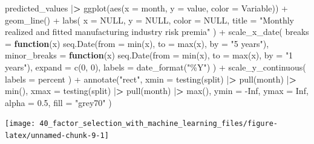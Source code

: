\documentclass[
]{book}
\newenvironment{Shaded}{\begin{snugshade}}{\end{snugshade}}
\newcommand{\AttributeTok}[1]{\textcolor[rgb]{0.61,0.61,0.61}{#1}}
\newcommand{\ConstantTok}[1]{\textcolor[rgb]{0,0,0}{#1}}
\newcommand{\ControlFlowTok}[1]{\textcolor[rgb]{0.27,0.27,0.27}{\textbf{#1}}}
\newcommand{\DecValTok}[1]{\textcolor[rgb]{0.06,0.06,0.06}{#1}}
\newcommand{\ErrorTok}[1]{\textcolor[rgb]{0.14,0.14,0.14}{\textbf{#1}}}
\newcommand{\FloatTok}[1]{\textcolor[rgb]{0.06,0.06,0.06}{#1}}
\newcommand{\FunctionTok}[1]{\textcolor[rgb]{0,0,0}{#1}}
\newcommand{\NormalTok}[1]{#1}
\newcommand{\SpecialCharTok}[1]{\textcolor[rgb]{0,0,0}{#1}}
\newcommand{\StringTok}[1]{\textcolor[rgb]{0.5,0.5,0.5}{#1}}
\begin{document}
\begin{Shaded}
\begin{Highlighting}[]
\NormalTok{predicted\_values }\SpecialCharTok{|}\ErrorTok{\textgreater{}}
  \FunctionTok{ggplot}\NormalTok{(}\FunctionTok{aes}\NormalTok{(}\AttributeTok{x =}\NormalTok{ month, }\AttributeTok{y =}\NormalTok{ value, }\AttributeTok{color =}\NormalTok{ Variable)) }\SpecialCharTok{+}
  \FunctionTok{geom\_line}\NormalTok{() }\SpecialCharTok{+}
  \FunctionTok{labs}\NormalTok{(}
    \AttributeTok{x =} \ConstantTok{NULL}\NormalTok{,}
    \AttributeTok{y =} \ConstantTok{NULL}\NormalTok{,}
    \AttributeTok{color =} \ConstantTok{NULL}\NormalTok{,}
    \AttributeTok{title =} \StringTok{"Monthly realized and fitted manufacturing industry risk premia"}
\NormalTok{  ) }\SpecialCharTok{+}
  \FunctionTok{scale\_x\_date}\NormalTok{(}
    \AttributeTok{breaks =} \ControlFlowTok{function}\NormalTok{(x) }\FunctionTok{seq.Date}\NormalTok{(}\AttributeTok{from =} \FunctionTok{min}\NormalTok{(x), }\AttributeTok{to =} \FunctionTok{max}\NormalTok{(x), }\AttributeTok{by =} \StringTok{"5 years"}\NormalTok{),}
    \AttributeTok{minor\_breaks =} \ControlFlowTok{function}\NormalTok{(x) }\FunctionTok{seq.Date}\NormalTok{(}\AttributeTok{from =} \FunctionTok{min}\NormalTok{(x), }\AttributeTok{to =} \FunctionTok{max}\NormalTok{(x), }\AttributeTok{by =} \StringTok{"1 years"}\NormalTok{),}
    \AttributeTok{expand =} \FunctionTok{c}\NormalTok{(}\DecValTok{0}\NormalTok{, }\DecValTok{0}\NormalTok{),}
    \AttributeTok{labels =} \FunctionTok{date\_format}\NormalTok{(}\StringTok{"\%Y"}\NormalTok{)}
\NormalTok{  ) }\SpecialCharTok{+}
  \FunctionTok{scale\_y\_continuous}\NormalTok{(}
    \AttributeTok{labels =}\NormalTok{ percent}
\NormalTok{  ) }\SpecialCharTok{+}
  \FunctionTok{annotate}\NormalTok{(}\StringTok{"rect"}\NormalTok{,}
    \AttributeTok{xmin =} \FunctionTok{testing}\NormalTok{(split) }\SpecialCharTok{|}\ErrorTok{\textgreater{}} \FunctionTok{pull}\NormalTok{(month) }\SpecialCharTok{|}\ErrorTok{\textgreater{}} \FunctionTok{min}\NormalTok{(),}
    \AttributeTok{xmax =} \FunctionTok{testing}\NormalTok{(split) }\SpecialCharTok{|}\ErrorTok{\textgreater{}} \FunctionTok{pull}\NormalTok{(month) }\SpecialCharTok{|}\ErrorTok{\textgreater{}} \FunctionTok{max}\NormalTok{(),}
    \AttributeTok{ymin =} \SpecialCharTok{{-}}\ConstantTok{Inf}\NormalTok{, }\AttributeTok{ymax =} \ConstantTok{Inf}\NormalTok{,}
    \AttributeTok{alpha =} \FloatTok{0.5}\NormalTok{, }\AttributeTok{fill =} \StringTok{"grey70"}
\NormalTok{  )}
\end{Highlighting}
\end{Shaded}

\begin{center}\texttt{[image: 40\_factor\_selection\_with\_machine\_learning\_files/figure-latex/unnamed-chunk-9-1]} \end{center}
\end{document}
